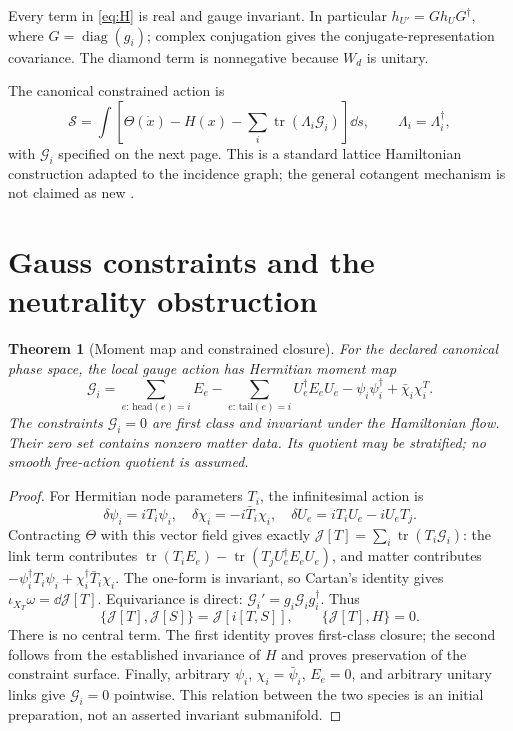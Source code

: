 \documentclass[11pt,a4paper]{article}
\newtheorem{theorem}{Theorem}\newtheorem{proposition}[theorem]{Proposition}\newtheorem{corollary}[theorem]{Corollary}
\newcommand{\tr}{\operatorname{tr}}\newcommand{\Rea}{\operatorname{Re}}\newcommand{\Ima}{\operatorname{Im}}
\begin{document}
Every term in \eqref{eq:H} is real and gauge invariant. In particular $h_{U'}=G h_U G^\dagger$, where $G=\operatorname{diag}(g_i)$; complex conjugation gives the conjugate-representation covariance. The diamond term is nonnegative because $W_d$ is unitary.

The canonical constrained action is
\[
\mathcal S=\int\!\left[\Theta(\dot x)-H(x)-\sum_i\tr(\Lambda_i\mathcal G_i)\right]\dd s,
\qquad \Lambda_i=\Lambda_i^\dagger,
\]
with $\mathcal G_i$ specified on the next page. This is a standard lattice Hamiltonian construction adapted to the incidence graph; the general cotangent mechanism is not claimed as new \cite{KS,Frolov}.

\newpage
\section{Gauss constraints and the neutrality obstruction}
\begin{theorem}[Moment map and constrained closure]\label{th:closure}
For the declared canonical phase space, the local gauge action has Hermitian moment map
\begin{equation}
\mathcal G_i=\sum_{e:\,\mathrm{head}(e)=i}E_e
-\sum_{e:\,\mathrm{tail}(e)=i}U_e^\dagger E_eU_e
-\psi_i\psi_i^\dagger+\bar\chi_i\chi_i^T.\label{eq:Gauss}
\end{equation}
The constraints $\mathcal G_i=0$ are first class and invariant under the Hamiltonian flow. Their zero set contains nonzero matter data. Its quotient may be stratified; no smooth free-action quotient is assumed.
\end{theorem}
\begin{proof}
For Hermitian node parameters $T_i$, the infinitesimal action is
\[
\delta\psi_i=iT_i\psi_i,\quad\delta\chi_i=-i\bar T_i\chi_i,
\quad\delta U_e=iT_iU_e-iU_eT_j.
\]
Contracting $\Theta$ with this vector field gives exactly
$\mathcal J[T]=\sum_i\tr(T_i\mathcal G_i)$: the link term contributes
$\tr(T_iE_e)-\tr(T_jU_e^\dagger E_eU_e)$, and matter contributes
$-\psi_i^\dagger T_i\psi_i+\chi_i^\dagger\bar T_i\chi_i$.
The one-form is invariant, so Cartan's identity gives
$\iota_{X_T}\omega=\dd\mathcal J[T]$. Equivariance is direct:
$\mathcal G_i'=g_i\mathcal G_ig_i^\dagger$. Thus
\[
\{\mathcal J[T],\mathcal J[S]\}=\mathcal J[i[T,S]],
\qquad \{\mathcal J[T],H\}=0.
\]
There is no central term. The first identity proves first-class closure; the second follows from the established invariance of $H$ and proves preservation of the constraint surface. Finally, arbitrary $\psi_i$, $\chi_i=\bar\psi_i$, $E_e=0$, and arbitrary unitary links give $\mathcal G_i=0$ pointwise. This relation between the two species is an initial preparation, not an asserted invariant submanifold.
\end{proof}
\end{document}
